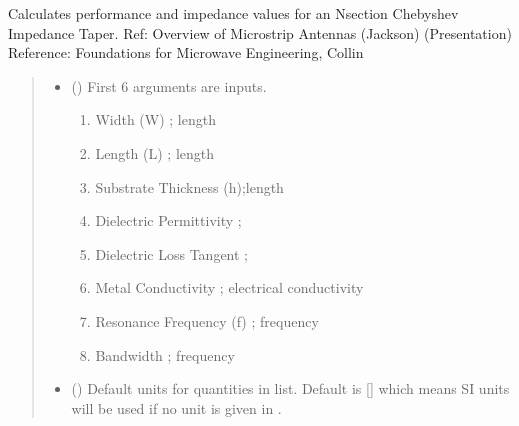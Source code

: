 \documentclass[letterpaper,10pt,english]{sphinxmanual}
\begin{document}

\begin{fulllineitems}
\label{\detokenize{components:components.Patch_Antenna_Analysis}}
\pysigstartsignatures
{}
\pysigstopsignatures
\sphinxAtStartPar
Calculates performance and impedance values for an N\sphinxhyphen{}section Chebyshev Impedance Taper.
Ref: Overview of Microstrip Antennas (Jackson) (Presentation)
Reference:  Foundations for Microwave Engineering, Collin
\begin{quote}\begin{description}
\begin{itemize}
\item {}
\sphinxAtStartPar
{} () \textendash{}
\sphinxAtStartPar
First 6 arguments are inputs.
\begin{enumerate}
%
\item {}
\sphinxAtStartPar
Width (W) ; length

\item {}
\sphinxAtStartPar
Length (L) ; length

\item {}
\sphinxAtStartPar
Substrate Thickness (h);length

\item {}
\sphinxAtStartPar
Dielectric Permittivity ;

\item {}
\sphinxAtStartPar
Dielectric Loss Tangent ;

\item {}
\sphinxAtStartPar
Metal Conductivity ; electrical conductivity

\item {}
\sphinxAtStartPar
Resonance Frequency (f) ; frequency

\item {}
\sphinxAtStartPar
Bandwidth ; frequency

\end{enumerate}


\item {}
\sphinxAtStartPar
{} (\sphinxstyleliteralemphasis{\sphinxupquote{, }}) \textendash{} Default units for quantities in  list. Default is {[}{]} which means SI units will be used if no unit is given in .


\end{itemize}
\end{description}
\end{quote}
\end{fulllineitems}
\end{document}
